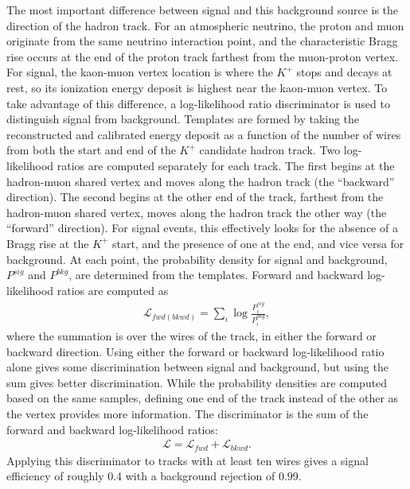 The most important difference between signal and this background source is the direction of the hadron track. For an atmospheric neutrino, the proton and muon originate from the same neutrino interaction point, and the characteristic Bragg rise occurs at the end of the proton track farthest from the muon-proton vertex. For signal, the kaon-muon vertex location is where the $K^{+}$ stops and decays at rest, so its ionization energy deposit is highest near the kaon-muon vertex.  To take advantage of this difference, a log-likelihood ratio discriminator is used to distinguish signal from background.  Templates are formed by taking the reconstructed and calibrated energy deposit as a function of the number of wires from both the start and end of the $K^{+}$ candidate hadron track. 
Two log-likelihood ratios are computed separately for each track. The first begins at the hadron-muon shared vertex and moves along the hadron track (the ``backward'' direction). The second begins at the other end of the track, farthest from the hadron-muon shared vertex, moves along the hadron track the other way (the ``forward'' direction). For signal events, this effectively looks for the absence of a Bragg rise at the $K^{+}$ start, and the presence of one at the end, and vice versa for background.  At each point, the probability density for signal and background, $P^{sig}$ and $P^{bkg}$, are determined from the templates. Forward and backward log-likelihood ratios are computed as
%
\begin{align}
 \mathcal{L}_{fwd(bkwd)} = \sum_{i} \log\frac{P^{sig}_i}{P^{bkg}_i}, 
\end{align}
where the summation is over the wires of the track, in either the forward or backward direction.  Using either the forward or backward log-likelihood ratio alone gives some discrimination between signal and background, but using the sum gives better discrimination. While the probability densities are computed based on the same samples, defining one end of the track instead of the other as the vertex provides more information. The discriminator is the sum of the forward and backward log-likelihood ratios:
%
\begin{align}
    \mathcal{L} = \mathcal{L}_{fwd} + \mathcal{L}_{bkwd}.\label{eqn:L}
\end{align}
Applying this discriminator to tracks with at least ten wires gives a signal efficiency of roughly \num{0.4} with a background rejection of \num{0.99}.

